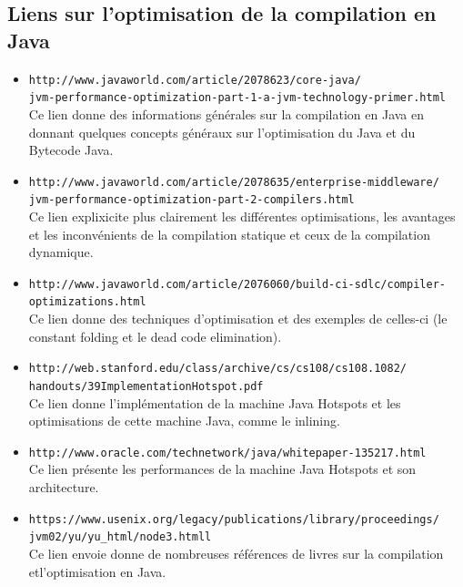 \documentclass[a4paper]{article}
\begin{document}
\subsection{Liens sur l'optimisation de la compilation en Java}
\begin{itemize}
\item \texttt{http://www.javaworld.com/article/2078623/core-java/\\jvm-performance-optimization-part-1-a-jvm-technology-primer.html} \\
Ce lien donne des informations générales sur la compilation en Java en donnant quelques concepts généraux sur l'optimisation du Java et du Bytecode Java.\\

\item \texttt{http://www.javaworld.com/article/2078635/enterprise-middleware/\\jvm-performance-optimization-part-2-compilers.html} \\
Ce lien explixicite plus clairement les différentes optimisations, les avantages et les inconvénients de la compilation statique et ceux de la compilation dynamique.\\

\item \texttt{http://www.javaworld.com/article/2076060/build-ci-sdlc/compiler-optimizations.html} \\
Ce lien donne des techniques d'optimisation et des exemples de celles-ci (le constant folding et le dead code elimination).\\

\item \texttt{http://web.stanford.edu/class/archive/cs/cs108/cs108.1082/\\handouts/39ImplementationHotspot.pdf} \\
Ce lien donne l'implémentation de la machine Java Hotspots et les optimisations de cette machine Java, comme le inlining.\\

\item \texttt{http://www.oracle.com/technetwork/java/whitepaper-135217.html} \\
Ce lien présente les performances de la machine Java Hotspots et son architecture.\\

\item \texttt{https://www.usenix.org/legacy/publications/library/proceedings/\\jvm02/yu/yu\_html/node3.htmll} \\
Ce lien envoie donne de nombreuses références de livres sur la compilation etl'optimisation en Java.\\
     \end{itemize}
\end{document}
